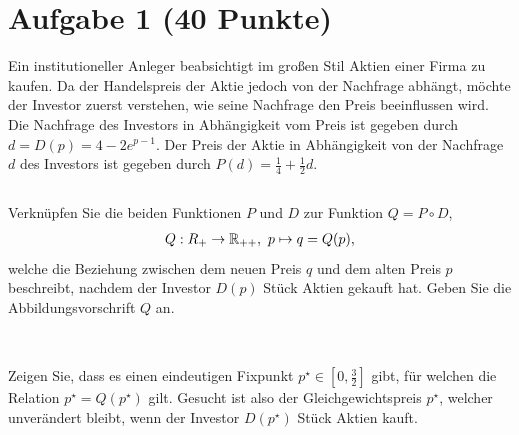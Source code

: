 \section*{Aufgabe 1 (40 Punkte)}
\vspace{0.4cm}
Ein institutioneller Anleger beabsichtigt im großen Stil Aktien einer Firma zu kaufen.
Da der Handelspreis der Aktie jedoch von der Nachfrage abhängt, möchte der Investor zuerst verstehen, wie seine Nachfrage den Preis beeinflussen wird.
Die Nachfrage des Investors in Abhängigkeit vom Preis ist gegeben durch $ d = D(p) =4 - 2 e^{p-1}$.
Der Preis der Aktie in Abhängigkeit von der Nachfrage $ d $ des Investors ist gegeben durch $ P(d) = \frac{1}{4} + \frac{1}{2} d $.
\subsection*{} 
Verknüpfen Sie die beiden Funktionen $ P $ und $ D $ \hspace{\parindent}zur Funktion $ Q = P \circ D $,
\begin{align*}
	Q : R_+ \to \mathbb{R}_{++} , \ p \mapsto q= Q(p),
\end{align*}
welche die Beziehung zwischen dem neuen Preis $ q $ und dem alten Preis $ p $ beschreibt, nachdem 
der Investor $ D(p) $ Stück Aktien gekauft hat.
Geben Sie die Abbildungsvorschrift $ Q $ an.
\\
\\


\subsection*{} Zeigen Sie, dass es einen eindeutigen Fixpunkt $ p^\star \in \left[0,\frac{3}{2}\right] $ gibt, für welchen die Relation $ p^\star = Q(p^\star) $ gilt.
Gesucht ist also der Gleichgewichtspreis $ p^\star $, welcher unverändert bleibt, wenn der Investor $ D(p^\star ) $ Stück Aktien kauft.
 \\
\\
\titleformat{\subsection}[display]
{\normalfont\large\bfseries}{\thesubsection}{1mm}{}
